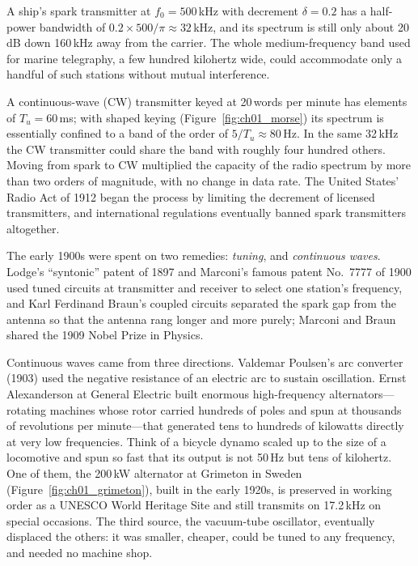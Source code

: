 \begin{worked}
A ship's spark transmitter at $f_0=500$\,kHz with decrement $\delta=0.2$ has a half-power
bandwidth of $0.2\times500/\pi\approx32$\,kHz, and its spectrum is still only about 20\,dB down
160\,kHz away from the carrier. The whole medium-frequency band used for marine telegraphy, a few hundred
kilohertz wide, could accommodate only a handful of such stations without mutual interference.

A continuous-wave (CW) transmitter keyed at 20\,words per minute has elements of $T_u=60$\,ms; with
shaped keying (Figure~\ref{fig:ch01_morse}) its spectrum is essentially confined to a band of the order
of $5/T_u\approx 80$\,Hz. In the same 32\,kHz the CW transmitter could share the band with roughly four
hundred others. Moving from spark to CW multiplied the capacity of the radio spectrum by more than two
orders of magnitude, with no change in data rate. The United States' Radio Act of 1912 began the
process by limiting the decrement of licensed transmitters, and international regulations eventually
banned spark transmitters altogether.
\end{worked}

The early 1900s were spent on two remedies: \emph{tuning}, and \emph{continuous waves}. Lodge's
``syntonic'' patent of 1897 and Marconi's famous patent No.~7777 of 1900 used tuned circuits at
transmitter and receiver to select one station's frequency, and Karl Ferdinand Braun's coupled
circuits separated the spark gap from the antenna so that the antenna rang longer and more purely;
Marconi and Braun shared the 1909 Nobel Prize in Physics.

Continuous waves came from three directions. Valdemar Poulsen's arc converter (1903) used the negative
resistance of an electric arc to sustain oscillation. Ernst Alexanderson at General Electric built
enormous high-frequency alternators---rotating machines whose rotor carried hundreds of poles and spun
at thousands of revolutions per minute---that generated tens to hundreds of kilowatts directly at very
low frequencies. Think of a bicycle dynamo scaled up to the size of a locomotive and spun so fast
that its output is not 50\,Hz but tens of kilohertz. One of them, the 200\,kW alternator at Grimeton in
Sweden (Figure~\ref{fig:ch01_grimeton}), built in the early 1920s, is preserved in working order as a
UNESCO World Heritage Site and still transmits on 17.2\,kHz on special occasions. The third source,
the vacuum-tube oscillator, eventually displaced the others: it was smaller, cheaper, could be tuned
to any frequency, and needed no machine shop.

